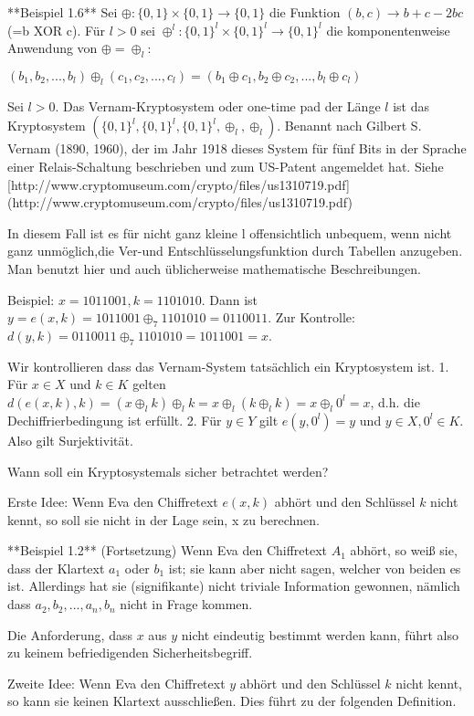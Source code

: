 \documentclass[a4paper]{article}
\begin{document}
\begin{multicols}{3}
    **Beispiel 1.6** Sei $\oplus:\{0,1\}\times\{0,1\}\rightarrow\{0,1\}$ die Funktion $(b,c)\rightarrow b+c-2bc$ (=b XOR c).
    Für $l>0$ sei $\oplus^l:\{0,1\}^l\times\{0,1\}^l\rightarrow\{0,1\}^l$ die komponentenweise Anwendung von $\oplus=\oplus_l$:

    $(b_1,b_2,...,b_l)\oplus_l(c_1,c_2,...,c_l) = (b_1\oplus c_1,b_2\oplus c_2,...,b_l\oplus c_l)$

    Sei $l>0$. Das Vernam-Kryptosystem oder one-time pad der Länge $l$ ist das Kryptosystem $(\{0,1\}^l,\{0,1\}^l,\{0,1\}^l,\oplus_l,\oplus_l)$. Benannt nach Gilbert S. Vernam (1890, 1960), der im Jahr 1918 dieses System für fünf Bits in der Sprache einer Relais-Schaltung beschrieben und zum US-Patent angemeldet hat. Siehe [http://www.cryptomuseum.com/crypto/files/us1310719.pdf](http://www.cryptomuseum.com/crypto/files/us1310719.pdf)

    In diesem Fall ist es für nicht ganz kleine l offensichtlich unbequem, wenn nicht ganz unmöglich,die Ver-und Entschlüsselungsfunktion durch Tabellen anzugeben. Man benutzt hier und auch üblicherweise mathematische Beschreibungen.

    Beispiel: $x=1011001,k=1101010$. Dann ist $y=e(x,k)=1011001\oplus_7 1101010 = 0110011$. Zur Kontrolle: $d(y,k) = 0110011\oplus_7 1101010 = 1011001 =x$.

    Wir kontrollieren dass das Vernam-System tatsächlich ein Kryptosystem ist.
    1. Für $x\in X$ und $k\in K$ gelten $d(e(x,k),k)=(x\oplus_l k)\oplus_l k=x\oplus_l(k\oplus_l k) =x\oplus_l 0^l=x$, d.h. die Dechiffrierbedingung ist erfüllt.
    2. Für $y\in Y$ gilt $e(y,0^l) =y$ und $y\in X,0^l\in K$. Also gilt Surjektivität.

    Wann soll ein Kryptosystemals sicher betrachtet werden?

    Erste Idee: Wenn Eva den Chiffretext $e(x,k)$ abhört und den Schlüssel $k$ nicht kennt, so soll sie nicht in der Lage sein, x zu berechnen.

    **Beispiel 1.2** (Fortsetzung) Wenn Eva den Chiffretext $A_1$ abhört, so weiß sie, dass der Klartext $a_1$ oder $b_1$ ist; sie kann aber nicht sagen, welcher von beiden es ist. Allerdings hat sie (signifikante) nicht triviale Information gewonnen, nämlich dass $a_2,b_2,...,a_n,b_n$ nicht in Frage kommen.

    Die Anforderung, dass $x$ aus $y$ nicht eindeutig bestimmt werden kann, führt also zu keinem befriedigenden Sicherheitsbegriff.

    Zweite Idee: Wenn Eva den Chiffretext $y$ abhört und den Schlüssel $k$ nicht kennt, so kann sie keinen Klartext ausschließen. Dies führt zu der folgenden Definition.


\end{multicols}
\end{document}
